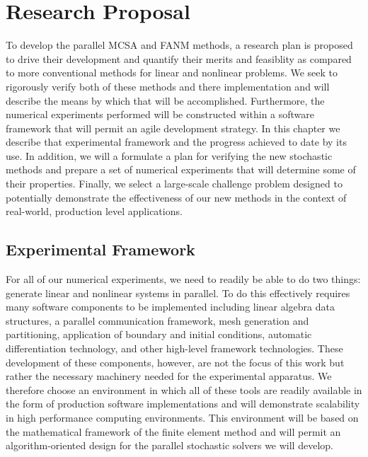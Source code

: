 \chapter{Research Proposal}
\label{ch:research_proposal}
To develop the parallel MCSA and FANM methods, a research plan is
proposed to drive their development and quantify their merits and
feasiblity as compared to more conventional methods for linear and
nonlinear problems. We seek to rigorously verify both of these methods
and there implementation and will describe the means by which that
will be accomplished. Furthermore, the numerical experiments performed
will be constructed within a software framework that will permit an
agile development strategy. In this chapter we describe that
experimental framework and the progress achieved to date by its
use. In addition, we will a formulate a plan for verifying the new
stochastic methods and prepare a set of numerical experiments that
will determine some of their properties. Finally, we select a
large-scale challenge problem designed to potentially demonstrate the
effectiveness of our new methods in the context of real-world,
production level applications.

\section{Experimental Framework}
\label{sec:experimental_framework}
For all of our numerical experiments, we need to readily be able to do
two things: generate linear and nonlinear systems in parallel. To do
this effectively requires many software components to be implemented
including linear algebra data structures, a parallel communication
framework, mesh generation and partitioning, application of boundary
and initial conditions, automatic differentiation technology, and
other high-level framework technologies. These development of these
components, however, are not the focus of this work but rather the
necessary machinery needed for the experimental apparatus. We
therefore choose an environment in which all of these tools are
readily available in the form of production software implementations
and will demonstrate scalability in high performance computing
environments. This environment will be based on the mathematical
framework of the finite element method and will permit an
algorithm-oriented design for the parallel stochastic solvers we will
develop.

